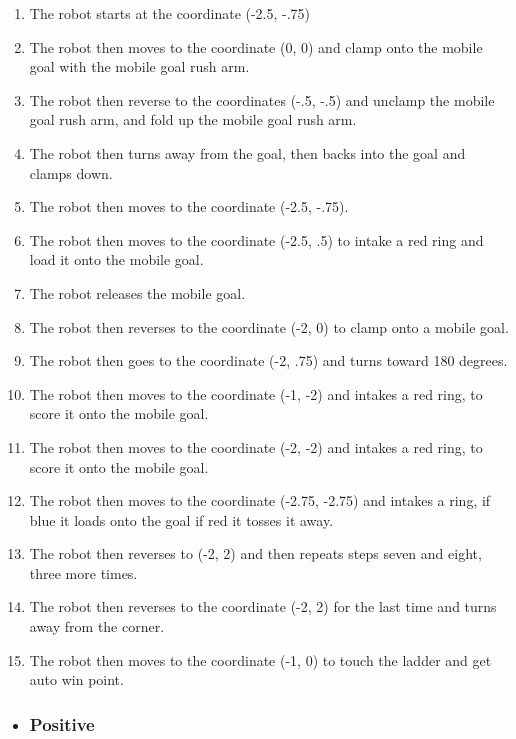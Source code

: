 \begin{enumerate}
    \item The robot starts at the coordinate (-2.5, -.75)
    \item The robot then moves to the coordinate (0, 0) and clamp onto the mobile goal with the mobile goal rush arm.
    \item The robot then reverse to the coordinates (-.5, -.5) and unclamp the mobile goal rush arm, and fold up the mobile goal rush arm.
    \item The robot then turns away from the goal, then backs into the goal and clamps down.
    \item The robot then moves to the coordinate (-2.5, -.75).
    \item The robot then moves to the coordinate (-2.5, .5) to intake a red ring and load it onto the mobile goal.
    \item The robot releases the mobile goal.
    \item The robot then reverses to the coordinate (-2, 0) to clamp onto a mobile goal.
    \item The robot then goes to the coordinate (-2, .75) and turns toward 180 degrees.
    \item The robot then moves to the coordinate (-1, -2) and intakes a red ring, to score it onto the mobile goal.
    \item The robot then moves to the coordinate (-2, -2) and intakes a red ring, to score it onto the mobile goal.
    \item The robot then moves to the coordinate (-2.75, -2.75) and intakes a ring, if blue it loads onto the goal if red it tosses it away.
    \item The robot then reverses to (-2, 2) and then repeats steps seven and eight, three more times.
    \item The robot then reverses to the coordinate (-2, 2) for the last time and turns away from the corner.
    \item The robot then moves to the coordinate (-1, 0) to touch the ladder and get auto win point.
\end{enumerate}
\begin{itemize}
    \item \subsubsection{Positive}
\end{itemize}
